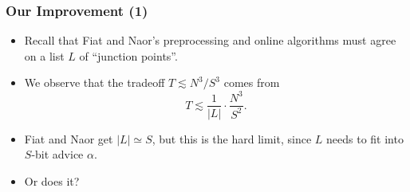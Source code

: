 \documentclass[usenames, dvipsnames, t, table]{beamer}
\begin{document}
    \begin{frame}
    \frametitle{Our Improvement (1)}
    \begin{itemize}
      \item Recall that Fiat and Naor's preprocessing and online algorithms must agree on a list $L$ of ``junction points''.
         \pause
       \item We observe that the tradeoff $T \lesssim N^3 / S^3$ comes from
         \[T \lesssim \frac{1}{|L|} \cdot \frac{N^3}{S^2}.\] \mypause
       \item Fiat and Naor get $|L|\simeq S$, but this is the hard limit, since $L$ needs to fit into $S$-bit advice $\alpha$.
           \pause
         \item Or does it?
    \end{itemize}
  \end{frame}
\end{document}
